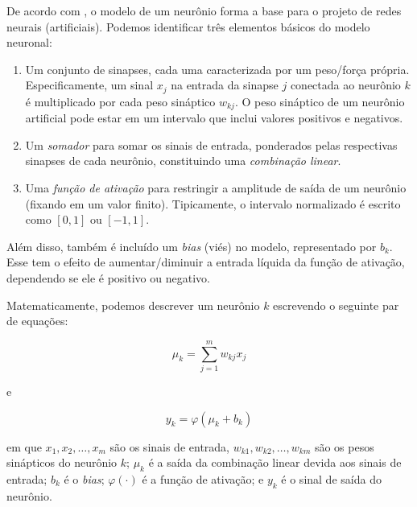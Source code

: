 \documentclass{automatextcc}
\begin{document}
De acordo com \citet{haykin2001redesneurais}, o modelo de um neurônio forma a base para o projeto de redes neurais (artificiais). Podemos identificar três elementos básicos do modelo neuronal:

\begin{enumerate}
    \item Um conjunto de sinapses, cada uma caracterizada por um peso/força própria. Especificamente, um sinal $x_j$ na entrada da sinapse $j$ conectada ao neurônio $k$ é multiplicado por cada peso sináptico $w_{kj}$. O peso sináptico de um neurônio artificial pode estar em um intervalo que inclui valores positivos e negativos.
    \item Um \textit{somador} para somar os sinais de entrada, ponderados pelas respectivas sinapses de cada neurônio, constituindo uma \textit{combinação linear}.
    \item Uma \textit{função de ativação} para restringir a amplitude de saída de um neurônio (fixando em um valor finito). Tipicamente, o intervalo normalizado é escrito como $[0,1]$ ou $[-1,1]$.
\end{enumerate}

Além disso, também é incluído um \textit{bias} (viés) no modelo, representado por $b_k$. Esse  tem o efeito de aumentar/diminuir a entrada líquida da função de ativação, dependendo se ele é positivo ou negativo. 

Matematicamente, podemos descrever um neurônio $k$ escrevendo o seguinte par de equações:

\begin{equation}
    \mu_k = \sum_{j=1}^{m} w_{kj}x_j
\end{equation}

e

\begin{equation}
    y_k = \varphi(\mu_k + b_k)
\end{equation}

em que $x_1,x_2,\dots,x_m$ são os sinais de entrada, $w_{k1},w_{k2},\dots,w_{km}$ são os pesos sinápticos do neurônio $k$; $\mu_k$ é a saída da combinação linear devida aos sinais de entrada; $b_k$ é o \textit{bias}; $\varphi(\cdot)$ é a função de ativação; e $y_k$ é o sinal de saída do neurônio.


\end{document}
